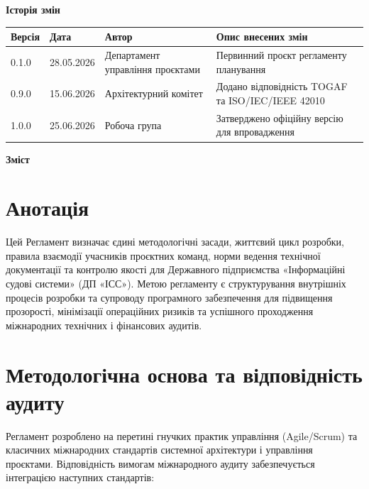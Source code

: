 \documentclass{article}
\begin{document}
\vspace{20pt}
\begin{center}
  {\large\color{nato}\bfseries Історія змін\par}
\end{center}
\vspace{10pt}
\begin{longtable}{@{}p{1.5cm}p{2.0cm}p{3.0cm}p{7.0cm}@{}}
\toprule
\textbf{Версія} & \textbf{Дата} & \textbf{Автор} & \textbf{Опис внесених змін} \\
\midrule
0.1.0 & 28.05.2026 & Департамент управління проєктами & Первинний проєкт регламенту планування \\
0.9.0 & 15.06.2026 & Архітектурний комітет & Додано відповідність TOGAF та ISO/IEC/IEEE 42010 \\
1.0.0 & 25.06.2026 & Робоча група & Затверджено офіційну версію для впровадження \\
\bottomrule
\end{longtable}

\newpage
\begin{center}
  {\Huge\color{nato}\bfseries Зміст\par}
\end{center}
\vspace{40pt}
\tableofcontents

\newpage

\section*{Анотація}
Цей Регламент визначає єдині методологічні засади, життєвий цикл розробки, правила взаємодії учасників проєктних команд, норми ведення технічної документації та контролю якості для Державного підприємства «Інформаційні судові системи» (ДП «ІСС»). Метою регламенту є структурування внутрішніх процесів розробки та супроводу програмного забезпечення для підвищення прозорості, мінімізації операційних ризиків та успішного проходження міжнародних технічних і фінансових аудитів.

\section*{Методологічна основа та відповідність аудиту}
Регламент розроблено на перетині гнучких практик управління (Agile/Scrum) та класичних міжнародних стандартів системної архітектури і управління проєктами. Відповідність вимогам міжнародного аудиту забезпечується інтеграцією наступних стандартів:
\end{document}
